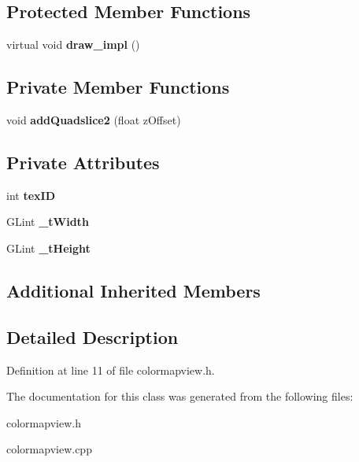 \subsection*{Protected Member Functions}
\begin{DoxyCompactItemize}
\item 
virtual void {\bfseries draw\-\_\-impl} ()\label{classSoundfieldViewer_1_1ColormapView_a727deffb62299dc5d30f5e31ad3b9ece}

\end{DoxyCompactItemize}
\subsection*{Private Member Functions}
\begin{DoxyCompactItemize}
\item 
void {\bfseries add\-Quadslice2} (float z\-Offset)\label{classSoundfieldViewer_1_1ColormapView_ab14efbad2028add6fedc03a6cab37ea7}

\end{DoxyCompactItemize}
\subsection*{Private Attributes}
\begin{DoxyCompactItemize}
\item 
int {\bfseries tex\-I\-D}\label{classSoundfieldViewer_1_1ColormapView_a9d314e5d31393efac34d51d513a3f495}

\item 
G\-Lint {\bfseries \-\_\-t\-Width}\label{classSoundfieldViewer_1_1ColormapView_a9f795d245b3320c91bc27ed0e051a3b6}

\item 
G\-Lint {\bfseries \-\_\-t\-Height}\label{classSoundfieldViewer_1_1ColormapView_a07a6717ad4a2bf40b298b3ace154dad4}

\end{DoxyCompactItemize}
\subsection*{Additional Inherited Members}


\subsection{Detailed Description}


Definition at line 11 of file colormapview.\-h.



The documentation for this class was generated from the following files\-:\begin{DoxyCompactItemize}
\item 
colormapview.\-h\item 
colormapview.\-cpp\end{DoxyCompactItemize}
